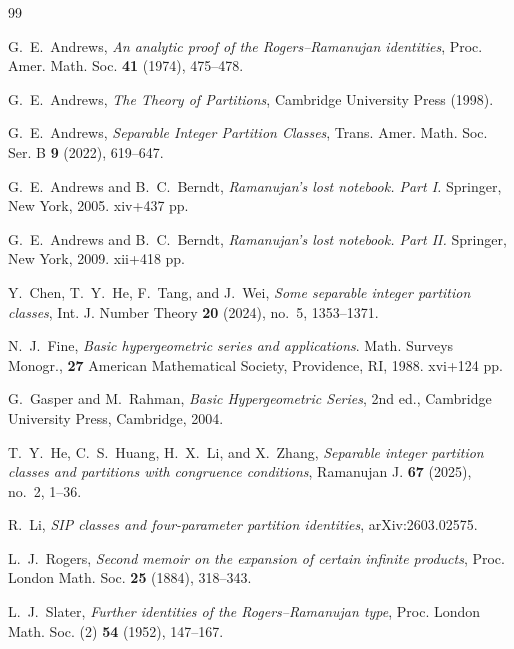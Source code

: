 \documentclass[12pt]{amsart}
\theoremstyle{definition}
\theoremstyle{remark}
\numberwithin{equation}{section}
\begin{document}
\begin{thebibliography}{99}

G.~E.~Andrews,
\emph{An analytic proof of the Rogers--Ramanujan identities},
Proc. Amer. Math. Soc. \textbf{41} (1974), 475--478.

 G.~E.~Andrews, {\it The Theory of Partitions}, Cambridge University Press (1998).

 G.~E.~Andrews, {\it Separable Integer Partition Classes}, Trans. Amer. Math. Soc. Ser. B \textbf{9} (2022), 619--647.

 G.~E.~Andrews and B.~C.~Berndt, \textit{Ramanujan's lost notebook. Part I.} Springer, New York, 2005. xiv+437 pp.

 G.~E.~Andrews and B.~C.~Berndt, \textit{Ramanujan's lost notebook. Part II.} Springer, New York, 2009. xii+418 pp.

Y.~Chen, T.~Y.~He, F.~Tang, and J.~Wei,
\emph{Some separable integer partition classes},
Int. J. Number Theory \textbf{20} (2024), no.~5, 1353--1371.

 N.~J.~Fine, \textit{Basic hypergeometric series and applications}. Math. Surveys Monogr., \textbf{27} American Mathematical Society, Providence, RI, 1988. xvi+124 pp.

G.~Gasper and M.~Rahman,
\emph{Basic Hypergeometric Series},
2nd ed., Cambridge University Press, Cambridge, 2004.

T.~Y.~He, C.~S.~Huang, H.~X.~Li, and X.~Zhang,
\emph{Separable integer partition classes and partitions with congruence conditions},
Ramanujan J. \textbf{67} (2025), no.~2, 1--36.

R.~Li,
\emph{SIP classes and four-parameter partition identities}, arXiv:2603.02575.

 L.~J.~Rogers, \textit{Second memoir on the expansion of certain infinite products}, Proc. London Math. Soc. \textbf{25} (1884), 318--343.

L.~J.~Slater,
\emph{Further identities of the Rogers--Ramanujan type},
Proc. London Math. Soc. (2) \textbf{54} (1952), 147--167.
\end{thebibliography}
\end{document}
